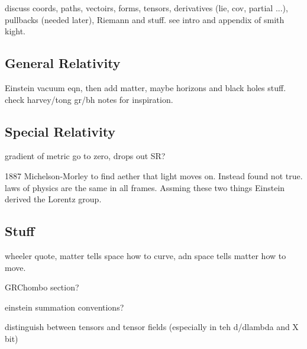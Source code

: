 discuss coords, paths, vectoirs, forms, tensors, derivatives (lie, cov, partial ...), pullbacks (needed later), Riemann and stuff. see intro and appendix of smith kight.

\subsection{General Relativity}
Einstein vacuum eqn, then add matter, maybe horizons and black holes stuff. check harvey/tong gr/bh notes for inspiration.

\subsection{Special Relativity}
gradient of metric go to zero, drops out SR?

1887 Michelson-Morley to find aether that light moves on. Instead found not true. laws of physics are the same in all frames. Assming these two things Einstein derived the Lorentz group.

\subsection{Stuff}
wheeler quote, matter tells space how to curve, adn space tells matter how to move.

GRChombo section?

einstein summation conventions?

distinguish between tensors and tensor fields (especially in teh d/dlambda and X bit)
